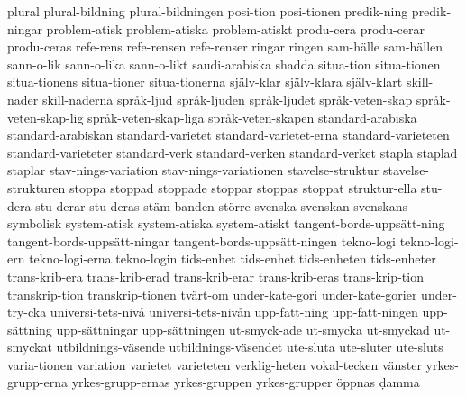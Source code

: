 {plural
plural-bildning
plural-bildningen
posi-tion
posi-tionen
predik-ning
predik-ningar
problem-atisk
problem-atiska
problem-atiskt
produ-cera
produ-cerar
produ-ceras
refe-rens
refe-rensen
refe-renser
ringar
ringen
sam-hälle
sam-hällen
sann-o-lik
sann-o-lika
sann-o-likt
saudi-arabiska
shadda
situa-tion
situa-tionen
situa-tionens
situa-tioner
situa-tionerna
själv-klar
själv-klara
själv-klart
skill-nader
skill-naderna
språk-ljud
språk-ljuden
språk-ljudet
språk-veten-skap
språk-veten-skap-lig
språk-veten-skap-liga
språk-veten-skapen
standard-arabiska
standard-arabiskan
standard-varietet
standard-varietet-erna
standard-varieteten
standard-varieteter
standard-verk
standard-verken
standard-verket
stapla
staplad
staplar
stav-nings-variation
stav-nings-variationen
stavelse-struktur
stavelse-strukturen
stoppa
stoppad
stoppade
stoppar
stoppas
stoppat
struktur-ella
stu-dera
stu-derar
stu-deras
stäm-banden
större
svenska
svenskan
svenskans
symbolisk
system-atisk
system-atiska
system-atiskt
tangent-bords-uppsätt-ning
tangent-bords-uppsätt-ningar
tangent-bords-uppsätt-ningen
tekno-logi
tekno-logi-ern
tekno-logi-erna
tekno-login
tids-enhet
tids-enhet
tids-enheten
tids-enheter
trans-krib-era
trans-krib-erad
trans-krib-erar
trans-krib-eras
trans-krip-tion
transkrip-tion
transkrip-tionen
tvärt-om
under-kate-gori
under-kate-gorier
under-try-cka
universi-tets-nivå
universi-tets-nivån
upp-fatt-ning
upp-fatt-ningen
upp-sättning
upp-sättningar
upp-sättningen
ut-smyck-ade
ut-smycka
ut-smyckad
ut-smyckat
utbildnings-väsende
utbildnings-väsendet
ute-sluta
ute-sluter
ute-sluts
varia-tionen
variation
varietet
varieteten
verklig-heten
vokal-tecken
vänster
yrkes-grupp-erna
yrkes-grupp-ernas
yrkes-gruppen
yrkes-grupper
öppnas
ḍamma
}
